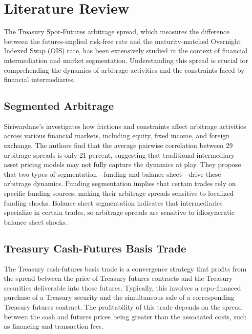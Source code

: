 \documentclass{article}
\begin{document}
\section{Literature Review} 

The Treasury Spot-Futures arbitrage spread, which measures the difference between the futures-implied risk-free rate and the maturity-matched Overnight Indexed Swap (OIS) rate, has been extensively studied in the context of financial intermediation and market segmentation. Understanding this spread is crucial for comprehending the dynamics of arbitrage activities and the constraints faced by financial intermediaries.

\subsection{Segmented Arbitrage}

Siriwardane's \cite{siriwardane2023segmented} investigates how frictions and constraints affect arbitrage activities across various financial markets, including equity, fixed income, and foreign exchange. The authors find that the average pairwise correlation between 29 arbitrage spreads is only 21 percent, suggesting that traditional intermediary asset pricing models may not fully capture the dynamics at play. They propose that two types of segmentation—funding and balance sheet—drive these arbitrage dynamics. Funding segmentation implies that certain trades rely on specific funding sources, making their arbitrage spreads sensitive to localized funding shocks. Balance sheet segmentation indicates that intermediaries specialize in certain trades, so arbitrage spreads are sensitive to idiosyncratic balance sheet shocks.

\subsection{Treasury Cash-Futures Basis Trade}

The Treasury cash-futures basis trade is a convergence strategy that profits from the spread between the price of Treasury futures contracts and the Treasury securities deliverable into those futures. Typically, this involves a repo-financed purchase of a Treasury security and the simultaneous sale of a corresponding Treasury futures contract. The profitability of this trade depends on the spread between the cash and futures prices being greater than the associated costs, such as financing and transaction fees.
\end{document}
